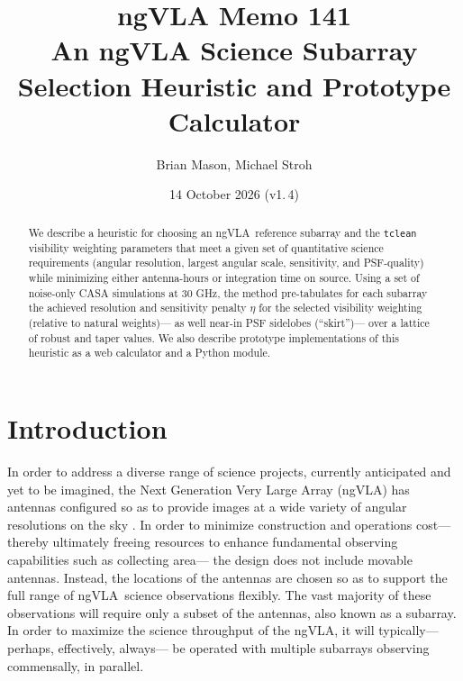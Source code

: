 \documentclass[11pt]{article}
\title{ngVLA Memo 141\\[0.5em]
  An ngVLA Science Subarray Selection Heuristic and Prototype Calculator}
\author{Brian Mason, Michael Stroh}
\date{14 October 2026 (v1.\,4)}
\newcommand{\ngvla}{ngVLA}
\begin{document}
\maketitle

\begin{abstract}
  We describe a heuristic for choosing an \ngvla\ reference
  subarray and the {\tt tclean} visibility weighting parameters that
  meet a given set of quantitative science requirements (angular
  resolution, largest angular scale, sensitivity, and PSF-quality)
  while minimizing either antenna-hours or integration time on source.
  Using a set of noise-only CASA simulations at 30 GHz, the method
  pre-tabulates for each subarray the achieved resolution and
  sensitivity penalty $\eta$ for the selected visibility weighting
  (relative to natural weights)--- as well near-in PSF sidelobes
  (``skirt'')--- over a lattice of robust and taper values. We also
  describe prototype implementations of this heuristic as a web calculator
  and a Python module.
\end{abstract}

\tableofcontents

\section{Introduction}
\label{sec:intro}

In order to address a diverse range of science projects, currently
anticipated and yet to be imagined, the Next Generation Very Large
Array (\ngvla) has antennas configured so as to provide images at a
wide variety of angular resolutions on the sky
\citep{configDescription,memo106}.  In order to minimize construction
and operations cost--- thereby ultimately freeing resources to enhance
fundamental observing capabilities such as collecting area--- the
design does not include movable antennas.  Instead, the locations of
the antennas are chosen so as to support the full range of \ngvla\
science observations flexibly.  The vast majority of these
observations will require only a subset of the antennas, also known as
a subarray.  In order to maximize the science throughput of the
\ngvla, it will typically--- perhaps, effectively, always--- be
operated with multiple subarrays observing commensally, in parallel.
\end{document}
